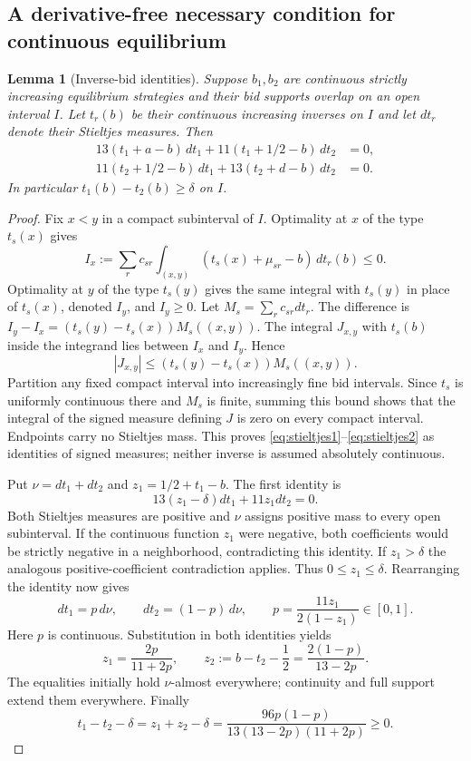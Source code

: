 \documentclass[11pt,a4paper]{article}
\newtheorem{lemma}[theorem]{Lemma}
\theoremstyle{remark}\newtheorem{remark}[theorem]{Remark}
\begin{document}
\subsection{A derivative-free necessary condition for continuous equilibrium}
\begin{lemma}[Inverse-bid identities]\label{lem:inverse}
Suppose $b_1,b_2$ are continuous strictly increasing equilibrium strategies and their bid supports overlap on an open interval $I$. Let $t_r(b)$ be their continuous increasing inverses on $I$ and let $dt_r$ denote their Stieltjes measures. Then
\begin{align}
 13(t_1+a-b)\,dt_1+11(t_1+1/2-b)\,dt_2&=0,\label{eq:stieltjes1}\\
 11(t_2+1/2-b)\,dt_1+13(t_2+d-b)\,dt_2&=0.\label{eq:stieltjes2}
\end{align}
In particular $t_1(b)-t_2(b)\ge\delta$ on $I$.
\end{lemma}
\begin{proof}
Fix $x<y$ in a compact subinterval of $I$. Optimality at $x$ of the type $t_s(x)$ gives
\[
 I_x:=\sum_r c_{sr}\int_{(x,y)}(t_s(x)+\mu_{sr}-b)\,dt_r(b)\le0.
\]
Optimality at $y$ of the type $t_s(y)$ gives the same integral with $t_s(y)$ in place of $t_s(x)$, denoted $I_y$, and $I_y\ge0$. Let $M_s=\sum_r c_{sr}dt_r$. The difference is
$I_y-I_x=(t_s(y)-t_s(x))M_s((x,y))$. The integral $J_{x,y}$ with $t_s(b)$ inside the integrand lies between $I_x$ and $I_y$. Hence
\[
 |J_{x,y}|\le(t_s(y)-t_s(x))M_s((x,y)).
\]
Partition any fixed compact interval into increasingly fine bid intervals. Since $t_s$ is uniformly continuous there and $M_s$ is finite, summing this bound shows that the integral of the signed measure defining $J$ is zero on every compact interval. Endpoints carry no Stieltjes mass. This proves \eqref{eq:stieltjes1}--\eqref{eq:stieltjes2} as identities of signed measures; neither inverse is assumed absolutely continuous.

Put $\nu=dt_1+dt_2$ and $z_1=1/2+t_1-b$. The first identity is
\[
 13(z_1-\delta)dt_1+11z_1dt_2=0.
\]
Both Stieltjes measures are positive and $\nu$ assigns positive mass to every open subinterval. If the continuous function $z_1$ were negative, both coefficients would be strictly negative in a neighborhood, contradicting this identity. If $z_1>\delta$ the analogous positive-coefficient contradiction applies. Thus $0\le z_1\le\delta$. Rearranging the identity now gives
\[
 dt_1=p\,d\nu,\qquad dt_2=(1-p)\,d\nu,
 \qquad p=\frac{11z_1}{2(1-z_1)}\in[0,1].
\]
Here $p$ is continuous. Substitution in both identities yields
\[
 z_1=\frac{2p}{11+2p},\qquad
 z_2:=b-t_2-\frac12=\frac{2(1-p)}{13-2p}.
\]
The equalities initially hold $\nu$-almost everywhere; continuity and full support extend them everywhere. Finally
\[
 t_1-t_2-\delta=z_1+z_2-\delta
   =\frac{96p(1-p)}{13(13-2p)(11+2p)}\ge0.
\]
\end{proof}
\end{document}

